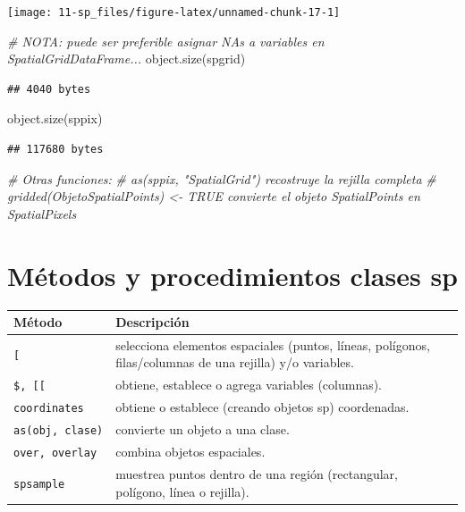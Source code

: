 \documentclass[
  spanish,
]{book}
\newenvironment{Shaded}{\begin{snugshade}}{\end{snugshade}}
\newcommand{\CommentTok}[1]{\textcolor[rgb]{0.56,0.35,0.01}{\textit{#1}}}
\newcommand{\FunctionTok}[1]{\textcolor[rgb]{0.00,0.00,0.00}{#1}}
\newcommand{\NormalTok}[1]{#1}
\theoremstyle{break}
\theoremstyle{definition}
\theoremstyle{definition}
\theoremstyle{definition}
\theoremstyle{definition}
\theoremstyle{remark}
\begin{document}
\begin{center}\texttt{[image: 11-sp\_files/figure-latex/unnamed-chunk-17-1]} \end{center}

\begin{Shaded}
\begin{Highlighting}[]
\CommentTok{\# NOTA: puede ser preferible asignar NA\textquotesingle{}s a variables en SpatialGridDataFrame...}
\FunctionTok{object.size}\NormalTok{(spgrid)}
\end{Highlighting}
\end{Shaded}

\begin{verbatim}
## 4040 bytes
\end{verbatim}

\begin{Shaded}
\begin{Highlighting}[]
\FunctionTok{object.size}\NormalTok{(sppix)}
\end{Highlighting}
\end{Shaded}

\begin{verbatim}
## 117680 bytes
\end{verbatim}

\begin{Shaded}
\begin{Highlighting}[]
\CommentTok{\# Otras funciones:}
\CommentTok{\# as(sppix, "SpatialGrid") recostruye la rejilla completa}
\CommentTok{\# gridded(ObjetoSpatialPoints) \textless{}{-} TRUE  convierte el objeto SpatialPoints en SpatialPixels}
\end{Highlighting}
\end{Shaded}

\hypertarget{muxe9todos-y-procedimientos-clases-sp}{%
\section{Métodos y procedimientos clases sp}\label{muxe9todos-y-procedimientos-clases-sp}}

\begin{longtable}[]{@{}
  >{\raggedright\arraybackslash}p{}
  >{\raggedright\arraybackslash}p{}@{}}
\toprule
Método & Descripción \\
\midrule
\endhead
\texttt{{[}} & selecciona elementos espaciales (puntos, líneas, polígonos, filas/columnas de una rejilla) y/o variables. \\
\texttt{\$,\ {[}{[}} & obtiene, establece o agrega variables (columnas). \\
\texttt{coordinates} & obtiene o establece (creando objetos sp) coordenadas. \\
\texttt{as(obj,\ clase)} & convierte un objeto a una clase. \\
\texttt{over,\ overlay} & combina objetos espaciales. \\
\texttt{spsample} & muestrea puntos dentro de una región (rectangular, polígono, línea o rejilla). \\
\bottomrule
\end{longtable}
\end{document}
